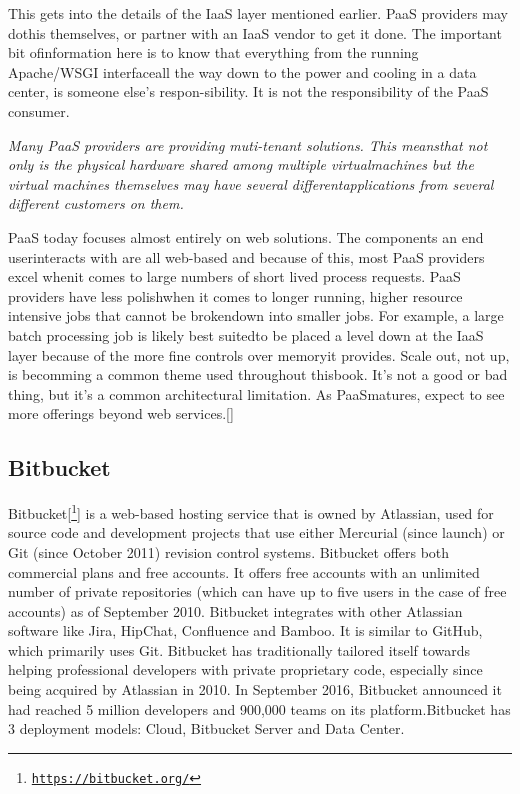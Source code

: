 This gets into the details of the IaaS layer mentioned earlier. PaaS providers may dothis themselves, or partner with an IaaS vendor to get it done. The important bit ofinformation here is to know that everything from the running Apache/WSGI interfaceall the way down to the power and cooling in a data center, is someone else’s respon-sibility. It is not the responsibility of the PaaS consumer.
\newline

\textit{Many PaaS providers are providing muti-tenant solutions. This meansthat not only is the physical hardware shared among multiple virtualmachines but the virtual machines themselves may have several differentapplications from several different customers on them.}
\newline

PaaS today focuses almost entirely on web solutions. The components an end userinteracts with are all web-based and because of this, most PaaS providers excel whenit comes to large numbers of short lived process requests. PaaS providers have less polishwhen it comes to longer running, higher resource intensive jobs that cannot be brokendown into smaller jobs. For example, a large batch processing job is likely best suitedto be placed a level down at the IaaS layer because of the more fine controls over memoryit provides. Scale out, not up, is becomming a common theme used throughout thisbook. It’s not a good or bad thing, but it’s a common architectural limitation. As PaaSmatures, expect to see more offerings beyond web services.[\cite{19}]

\subsection{Bitbucket}
Bitbucket[\footnote{\href{https://bitbucket.org/}{\texttt{https://bitbucket.org/}}}] is a web-based hosting service that is owned by Atlassian, used for source code and development projects that use either Mercurial (since launch) or Git (since October 2011) revision control systems. Bitbucket offers both commercial plans and free accounts. It offers free accounts with an unlimited number of private repositories (which can have up to five users in the case of free accounts) as of September 2010. Bitbucket integrates with other Atlassian software like Jira, HipChat, Confluence and Bamboo.
It is similar to GitHub, which primarily uses Git. Bitbucket has traditionally tailored itself towards helping professional developers with private proprietary code, especially since being acquired by Atlassian in 2010. In September 2016, Bitbucket announced it had reached 5 million developers and 900,000 teams on its platform.Bitbucket has 3 deployment models: Cloud, Bitbucket Server and Data Center.
